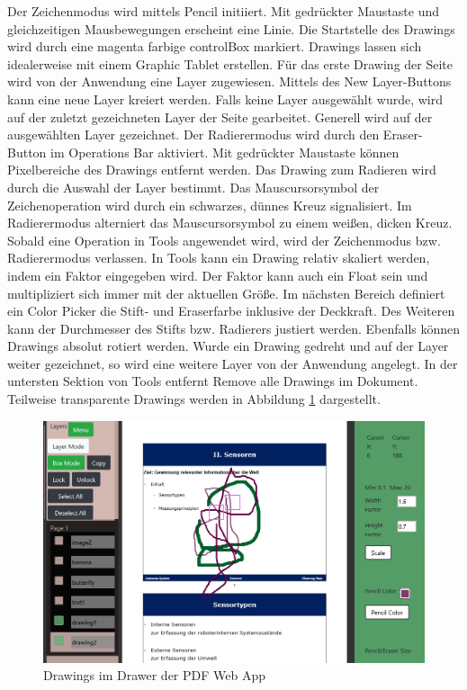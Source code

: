 Der Zeichenmodus wird mittels Pencil initiiert. Mit gedrückter Maustaste und gleichzeitigen Mausbewegungen erscheint eine Linie. Die Startstelle des Drawings wird durch eine magenta farbige controlBox markiert. Drawings lassen sich idealerweise mit einem Graphic Tablet erstellen. Für das erste Drawing der Seite wird von der Anwendung eine Layer zugewiesen. Mittels des New Layer-Buttons kann eine neue Layer kreiert werden. Falls keine Layer ausgewählt wurde, wird auf der zuletzt gezeichneten Layer der Seite gearbeitet. Generell wird auf der ausgewählten Layer gezeichnet. Der Radierermodus wird durch den Eraser-Button im Operations Bar aktiviert. Mit gedrückter Maustaste können Pixelbereiche des Drawings entfernt werden. Das Drawing zum Radieren wird durch die Auswahl der Layer bestimmt. Das Mauscursorsymbol der Zeichenoperation wird durch ein schwarzes, dünnes Kreuz signalisiert. Im Radierermodus alterniert das Mauscursorsymbol zu einem weißen, dicken Kreuz. Sobald eine Operation in Tools angewendet wird, wird der Zeichenmodus bzw. Radierermodus verlassen. In Tools kann ein Drawing relativ skaliert werden, indem ein Faktor eingegeben wird. Der Faktor kann auch ein Float sein und multipliziert sich immer mit der aktuellen Größe. Im nächsten Bereich definiert ein Color Picker die Stift- und Eraserfarbe inklusive der Deckkraft. Des Weiteren kann der Durchmesser des Stifts bzw. Radierers justiert werden. Ebenfalls können Drawings absolut rotiert werden. Wurde ein Drawing gedreht und auf der Layer weiter gezeichnet, so wird eine weitere Layer von der Anwendung angelegt. In der untersten Sektion von Tools entfernt Remove alle Drawings im Dokument. Teilweise transparente Drawings werden in Abbildung \ref{fig:drawing} dargestellt. 

\begin{figure}[!htbp]
	\centering
	\includegraphics[width=1\textwidth]{"images/drawing.png"}
	\caption{Drawings im Drawer der PDF Web App}
	\label{fig:drawing}
\end{figure}


